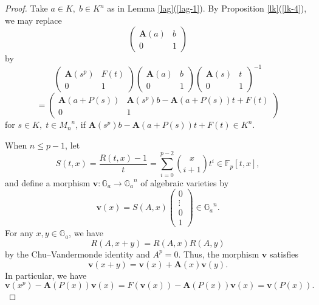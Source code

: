 \documentclass[sn-mathphys-num]{sn-jnl}
\numberwithin{equation}{section}
\theoremstyle{plain}
\theoremstyle{definition}
\begin{document}
\begin{proof}
  Take $a\in K,\;b\in K^n$ as in Lemma \ref{lag}(\ref{lag-1}).
 By Proposition \ref{lk}(\ref{lk-4}), we may replace
  \[
\begin{pmatrix}
  \mathbf{A}(a)&b\\
  0&1
\end{pmatrix}
\]
by
\[
\begin{pmatrix}
  \mathbf{A}(s^p)&F(t)\\
  0&1
\end{pmatrix}
\begin{pmatrix}
  \mathbf{A}(a)&b\\
  0&1
\end{pmatrix}
\begin{pmatrix}
  \mathbf{A}(s)&t\\
  0&1
\end{pmatrix}^{-1}
\]
\begin{equation}
=
\begin{pmatrix}
  \mathbf{A}(a+P(s))&\mathbf{A}(s^p)b-\mathbf{A}(a+P(s))t+F(t)\\
  0&1
\end{pmatrix}
\end{equation}
for $s\in K,\;t\in {M_n}^n$, if $\mathbf{A}(s^p)b-\mathbf{A}(a+P(s))t+F(t)\in K^n$.

When $n\leq p-1$, let
\begin{equation}
  S(t,x)=\frac{R(t,x)-1}{t}=\sum_{i=0}^{p-2}\binom{x}{i+1}t^i\in\mathbb{F}_p[t,x],
  \end{equation}
  and define a morphism $\mathbf{v}:\mathbb{G}_a\to {\mathbb{G}_a}^n$ of algebraic varieties by
\begin{equation}
\mathbf{v}(x)=S(A,x)
\begin{pmatrix}
  0\\
  \vdots\\
  0\\
  1
\end{pmatrix}\in {\mathbb{G}_a}^n.
\end{equation}
For any $x,y\in\mathbb{G}_a$, we have 
\begin{equation}
  R(A,x+y)=R(A,x)R(A,y)
\end{equation}
by the Chu--Vandermonde identity and $A^p=0$.
Thus, the morphism $\mathbf{v}$ satisfies
  \begin{equation}
  \mathbf{v}(x+y)=\mathbf{v}(x)+\mathbf{A}(x)\mathbf{v}(y).
  \end{equation}
  In particular, we have
  \begin{equation}\label{ex}
  \mathbf{v}(x^p)-\mathbf{A}(P(x))\mathbf{v}(x)=F(\mathbf{v}(x))-\mathbf{A}(P(x))\mathbf{v}(x)=\mathbf{v}(P(x)).
  \end{equation}


\end{proof}
\end{document}
